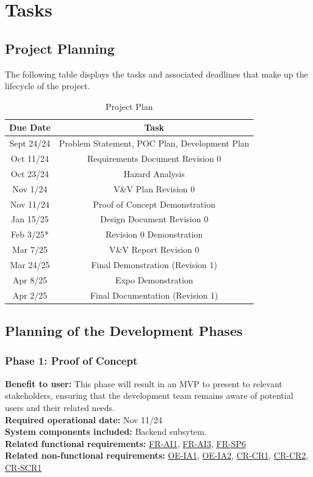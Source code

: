 \documentclass[12pt]{article}
\begin{document}
\section{Tasks}
\subsection{Project Planning}

The following table displays the tasks and associated deadlines that make up the lifecycle of the project.
\begin{table}
  \begin{tabular}{ |c|c| } 
    \hline
      \textbf{Due Date} & \textbf{Task} \\
    \hline
      Sept 24/24 & Problem Statement, POC Plan, Development Plan \\
    \hline
      Oct 11/24 & Requirements Document Revision 0 \\
    \hline
      Oct 23/24 & Hazard Analysis \\
    \hline
      Nov 1/24 & V\&V Plan Revision 0 \\
    \hline
      Nov 11/24 & Proof of Concept Demonstration \\
    \hline
      Jan 15/25 & Design Document Revision 0 \\
    \hline
      Feb 3/25* & Revision 0 Demonstration \\
    \hline
      Mar 7/25 & V\&V Report Revision 0 \\
    \hline
      Mar 24/25 & Final Demonstration (Revision 1) \\
    \hline
      Apr 8/25 & Expo Demonstration \\
    \hline
      Apr 2/25 & Final Documentation (Revision 1) \\
    \hline
  \end{tabular}
  \caption{Project Plan}
\end{table}



\subsection{Planning of the Development Phases}
\subsubsection*{Phase 1: Proof of Concept}
\textbf{Benefit to user:} This phase will result in an MVP to present to relevant stakeholders, ensuring that the development team remains aware of potential users and their related needs. \\
\textbf{Required operational date:} Nov 11/24 \\
\textbf{System components included:} Backend subsytem. \\
\textbf{Related functional requirements:} \hyperref[FR-AI1]{FR-AI1}, \hyperref[FR-AI3]{FR-AI3}, \hyperref[FR-SP6]{FR-SP6} \\
\textbf{Related non-functional requirements:} \hyperref[OE-IA1]{OE-IA1}, \hyperref[OE-IA2]{OE-IA2}, \hyperref[CR-CR1]{CR-CR1}, \hyperref[CR-CR2]{CR-CR2}, \hyperref[CR-SCR1]{CR-SCR1} \\
\end{document}
